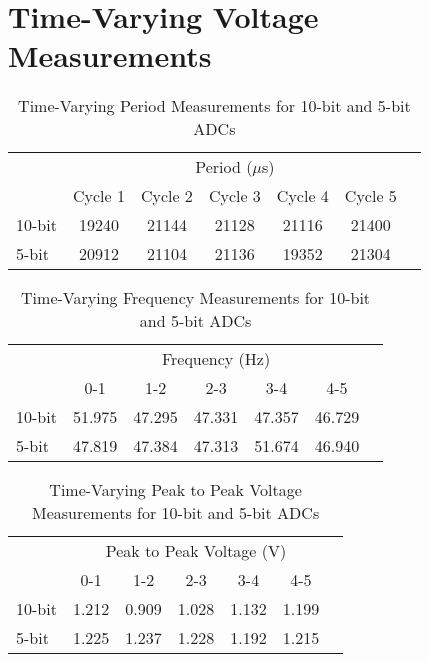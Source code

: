 \section{Time-Varying Voltage Measurements}
\begin{table}[h]
    \centering
    \caption{Time-Varying Period Measurements for 10-bit and 5-bit ADCs}
    \begin{tabular}{lcccccc}
    \toprule
       & \multicolumn{5}{c}{Period ($\mu$s)}    \\
    \cmidrule{2-6}
       & Cycle 1    & Cycle 2   & Cycle 3   & Cycle 4   & Cycle 5    \\
    \midrule
    10-bit & 19240 & 21144 & 21128 & 21116 & 21400  \\
    5-bit  & 20912 & 21104 & 21136 & 19352 & 21304  \\
    \bottomrule
    \end{tabular}
\end{table}

\begin{table}[h]
    \centering
    \caption{Time-Varying Frequency Measurements for 10-bit and 5-bit ADCs}
    \begin{tabular}{lcccccc}
    \toprule
       & \multicolumn{5}{c}{Frequency (Hz)}    \\
    \cmidrule{2-6}
       & 0-1    & 1-2   & 2-3   & 3-4   & 4-5    \\
    \midrule
    10-bit & 51.975 & 47.295 & 47.331 & 47.357 & 46.729  \\
    5-bit  & 47.819 & 47.384 & 47.313 & 51.674 & 46.940  \\
    \bottomrule
    \end{tabular}
\end{table}

\begin{table}[h]
    \centering
    \caption{Time-Varying Peak to Peak Voltage Measurements for 10-bit and 5-bit ADCs}
    \begin{tabular}{lcccccc}
    \toprule
       & \multicolumn{5}{c}{Peak to Peak Voltage (V)}    \\
    \cmidrule{2-6}
       & 0-1    & 1-2   & 2-3   & 3-4   & 4-5    \\
    \midrule
    10-bit & 1.212 & 0.909 & 1.028 & 1.132 & 1.199  \\
    5-bit  & 1.225 & 1.237 & 1.228 & 1.192 & 1.215  \\
    \bottomrule
    \end{tabular}
\end{table}

